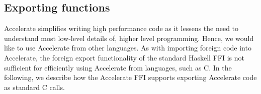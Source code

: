 
%

\subsection{Exporting functions}
\label{sec:foreign-export}

Accelerate simplifies writing high performance code as it lessens the need to understand most low-level details of, higher level programming. Hence, we would like to use Accelerate from other languages. As with importing foreign code into Accelerate, the foreign export functionality of the standard Haskell FFI is not sufficient for efficiently using Accelerate from languages, such as C. In the following, we describe how the Accelerate FFI supports exporting Accelerate code as standard C calls.

